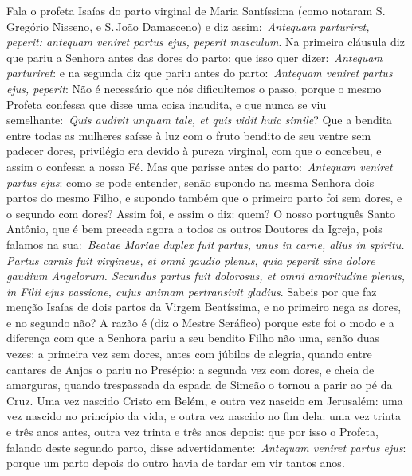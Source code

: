 Fala o profeta Isaías do parto virginal de Maria Santíssima
(como notaram S.\,Gregório Nisseno, e S.\,João Damasceno) e diz
assim:~\emph{Antequam parturiret, peperit: antequam veniret partus ejus,
peperit masculum}. Na primeira cláusula diz que pariu a
Senhora antes das dores do parto; que isso quer dizer:~\emph{Antequam
parturiret}: e na segunda diz que pariu antes do parto:~\emph{Antequam
veniret partus ejus, peperit}: Não é necessário que nós dificultemos o
passo, porque o mesmo Profeta confessa que disse uma coisa inaudita, e
que nunca se viu semelhante:~\emph{Quis audivit unquam tale, et quis
vidit huic simile}? Que a bendita entre todas as
mulheres saísse à luz com o fruto bendito de seu ventre sem padecer
dores, privilégio era devido à pureza virginal, com que o concebeu, e
assim o confessa a nossa Fé. Mas que parisse antes do
parto:~\emph{Antequam veniret partus ejus}: como se pode entender, senão
supondo na mesma Senhora dois partos do mesmo Filho, e supondo também
que o primeiro parto foi sem dores, e o segundo com dores? Assim foi, e
assim o diz: quem? O nosso português Santo Antônio, que é bem preceda
agora a todos os outros Doutores da Igreja, pois falamos na
sua:~\emph{Beatae Mariae duplex fuit partus, unus in carne, alius in
spiritu. Partus carnis fuit virgineus, et omni gaudio plenus, quia
peperit sine dolore gaudium Angelorum. Secundus partus fuit dolorosus,
et omni amaritudine plenus, in Filii ejus passione, cujus animam
pertransivit gladius}. Sabeis por que faz menção Isaías de dois partos
da Virgem Beatíssima, e no primeiro nega as dores, e no segundo não? A
razão é (diz o Mestre Seráfico) porque este foi o modo e a diferença com
que a Senhora pariu a seu bendito Filho não uma, senão duas vezes: a
primeira vez sem dores, antes com júbilos de alegria, quando entre
cantares de Anjos o pariu no Presépio: a segunda vez com dores, e cheia
de amarguras, quando trespassada da espada de Simeão o tornou a parir ao
pé da Cruz. Uma vez nascido Cristo em Belém, e outra vez nascido em
Jerusalém: uma vez nascido no princípio da vida, e outra vez nascido no
fim dela: uma vez trinta e três anos antes, outra vez trinta e três anos
depois: que por isso o Profeta, falando deste segundo parto, disse
advertidamente:~\emph{Antequam veniret partus ejus}: porque um parto
depois do outro havia de tardar em vir tantos anos.

